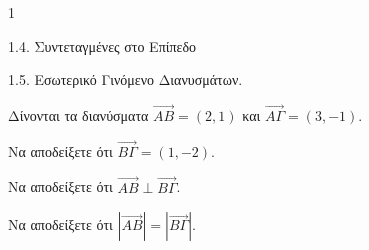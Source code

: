 \begin{ylh}{1}
    \item 1.4. Συντεταγμένες στο Επίπεδο
    \item 1.5. Εσωτερικό Γινόμενο Διανυσμάτων.
\end{ylh}
Δίνονται τα διανύσματα $\vec{AB}=(2,1)$ και $\vec{A\Gamma}=(3,-1)$.
\begin{alist}
\item Να αποδείξετε ότι $\vec{B\Gamma}=(1,-2)$. 
\item Να αποδείξετε ότι $\vec{AB} \perp \vec{B\Gamma}$. 
\item Να αποδείξετε ότι $|\vec{AB}|=|\vec{B\Gamma}|$. 
\end{alist}
